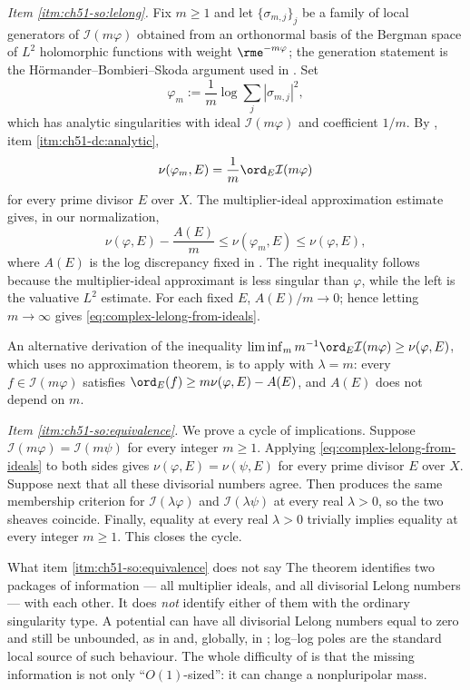 \emph{Item \cref{itm:ch51-so:lelong}.}  Fix \(m\geq1\) and let
\(\{\sigma_{m,j}\}_j\) be a family of local generators of
\(\mathcal I(m\varphi)\) obtained from an orthonormal basis of the
Bergman space of \(L^2\) holomorphic functions with weight
\(\rme^{-m\varphi}\); the generation statement is the
H\"ormander--Bombieri--Skoda argument used in \cite{Dem92reg}.  Set
\[
 \varphi_m:=\frac1m\log\sum_j|\sigma_{m,j}|^2 ,
\]
which has analytic singularities with ideal \(\mathcal I(m\varphi)\) and
coefficient \(1/m\).  By , item
\cref{itm:ch51-dc:analytic},
\[
 \nu(\varphi_m,E)=\frac1m\ord_E\mathcal I(m\varphi)
\]
for every prime divisor \(E\) over \(X\).  The multiplier-ideal
approximation estimate \cite[proof of Corollary~10.18]{Bou17} gives, in our
normalization,
\[
 \nu(\varphi,E)-\frac{A(E)}m
 \leq\nu(\varphi_m,E)\leq\nu(\varphi,E),
\]
where \(A(E)\) is the log discrepancy fixed in
.  The right inequality follows because
the multiplier-ideal approximant is less singular than \(\varphi\), while
the left is the valuative \(L^2\) estimate.  For each fixed \(E\),
\(A(E)/m\to0\); hence letting \(m\to\infty\) gives
\eqref{eq:complex-lelong-from-ideals}.

An alternative derivation of the inequality
\(\liminf_m m^{-1}\ord_E\mathcal I(m\varphi)\geq\nu(\varphi,E)\), which
uses no approximation theorem, is to apply
 with \(\lambda=m\): every
\(f\in\mathcal I(m\varphi)\) satisfies
\(\ord_E(f)\geq m\nu(\varphi,E)-A(E)\), and \(A(E)\) does not depend on
\(m\).

\emph{Item \cref{itm:ch51-so:equivalence}.}  We prove a cycle of
implications.  Suppose \(\mathcal I(m\varphi)=\mathcal I(m\psi)\) for
every integer \(m\geq1\).  Applying
\eqref{eq:complex-lelong-from-ideals} to both sides gives
\(\nu(\varphi,E)=\nu(\psi,E)\) for every prime divisor \(E\) over \(X\).
Suppose next that all these divisorial numbers agree.  Then
 produces the same membership
criterion for \(\mathcal I(\lambda\varphi)\) and
\(\mathcal I(\lambda\psi)\) at every real \(\lambda>0\), so the two
sheaves coincide.  Finally, equality at every real \(\lambda>0\)
trivially implies equality at every integer \(m\geq1\).  This closes the
cycle.

\begin{warning}{What item \cref{itm:ch51-so:equivalence} does not say}
\label{warn:ch51-so-scope}
The theorem identifies two packages of information --- all multiplier
ideals, and all divisorial Lelong numbers --- with each other.  It does
\emph{not} identify either of them with the ordinary singularity type.  A
potential can have all divisorial Lelong numbers equal to zero and still
be unbounded, as in  and, globally, in
; log--log poles are the standard local source of
such behaviour.  The whole difficulty of  is that
the missing information is not only ``\(O(1)\)-sized'': it can change a
nonpluripolar mass.
\end{warning}

